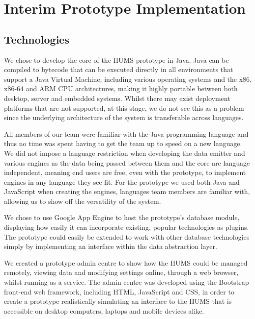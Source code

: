 \documentclass[10pt,a4paper]{article}
\begin{document}

\section{Interim Prototype Implementation}

\subsection{Technologies}
We chose to develop the core of the HUMS prototype in Java. Java can be compiled to bytecode that can be executed directly in all environments that support a Java Virtual Machine, including various operating systems and the x86, x86-64 and ARM CPU architectures, making it highly portable between both desktop, server and embedded systems. %
Whilst there may exist deployment platforms that are not supported, at this stage, we do not see this as a problem since the underlying architecture of the system is transferable across languages.

All members of our team were familiar with the Java programming language and thus no time was spent having to get the team up to speed on a new language. We did not impose a language restriction when developing the data emitter and various engines as the data being passed between them and the core are language independent, meaning end users are free, even with the prototype, to implement engines in any language they see fit. For the prototype we used both Java and JavaScript when creating the engines, languages team members are familiar with, allowing us to show off the versatility of the system.

We chose to use Google App Engine to host the prototype's database module, displaying how easily it can incorporate existing, popular technologies as plugins. The prototype could easily be extended to work with other database technologies simply by implementing an interface within the data abstraction layer.

We created a prototype admin centre to show how the HUMS could be managed remotely, viewing data and modifying settings online, through a web browser, whilst running as a service. The admin centre was developed using the Bootstrap front-end web framework, including HTML, JavaScript and CSS, in order to create a prototype realistically simulating an interface to the HUMS that is accessible on desktop computers, laptops and mobile devices alike.
\end{document}
